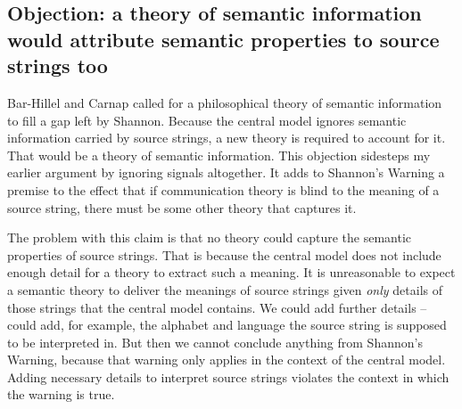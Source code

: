 

\subsection{Objection: a theory of semantic information would attribute semantic properties to source strings too}

Bar-Hillel and Carnap called for a philosophical theory of semantic information to fill a gap left by Shannon.
Because the central model ignores semantic information carried by source strings, a new theory is required to account for it.
That would be a theory of semantic information.
This objection sidesteps my earlier argument by ignoring signals altogether.
It adds to {\sc Shannon's Warning} a premise to the effect that if communication theory is blind to the meaning of a source string, there must be some other theory that captures it.

The problem with this claim is that no theory could capture the semantic properties of source strings.
That is because the central model does not include enough detail for a theory to extract such a meaning.
It is unreasonable to expect a semantic theory to deliver the meanings of source strings given \textit{only} details of those strings that the central model contains.
We could add further details -- could add, for example, the alphabet and language the source string is supposed to be interpreted in.
But then we cannot conclude anything from {\sc Shannon's Warning}, because that warning only applies in the context of the central model.
Adding necessary details to interpret source strings violates the context in which the warning is true.

